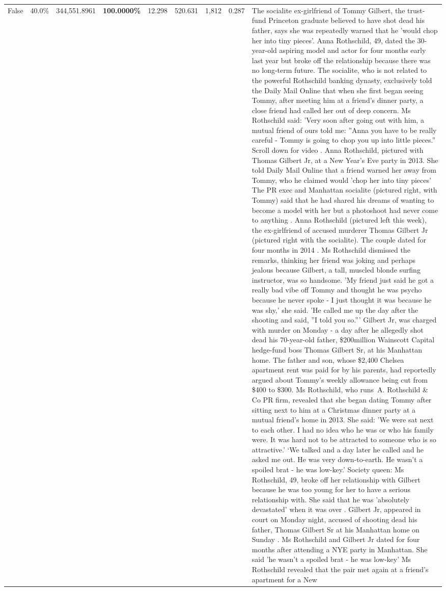 \begin{table}[H]
\begin{tabular}{lllrlllll}
False & 40.0\% & 344,551.8961 & \bfseries \color{red} 100.0000\% & 12.298 & 520.631 & 1,812 & 0.287 & The socialite ex-girlfriend of Tommy Gilbert, the trust-fund Princeton graduate believed to have shot dead his father, says she was repeatedly warned that he 'would chop her into tiny pieces'. Anna Rothschild, 49, dated the 30-year-old aspiring model and actor for four months early last year but broke off the relationship because there was no long-term future. The socialite, who is not related to the powerful Rothschild banking dynasty, exclusively told the Daily Mail Online that when she first began seeing Tommy, after meeting him at a friend's dinner party, a close friend had called her out of deep concern. Ms Rothschild said: 'Very soon after going out with him, a mutual friend of ours told me: ''Anna you have to be really careful - Tommy is going to chop you up into little pieces.'' Scroll down for video . Anna Rothschild, pictured with Thomas Gilbert Jr, at a New Year's Eve party in 2013. She told Daily Mail Online that a friend warned her away from Tommy, who he claimed would 'chop her into tiny pieces' The PR exec and Manhattan socialite (pictured right, with Tommy) said that he had shared his dreams of wanting to become a model with her but a photoshoot had never come to anything . Anna Rothschild (pictured left this week), the ex-girlfriend of accused murderer Thomas Gilbert Jr (pictured right with the socialite). The couple dated for four months in 2014 . Ms Rothschild dismissed the remarks, thinking her friend was joking and perhaps jealous because Gilbert, a tall, muscled blonde surfing instructor, was so handsome. 'My friend just said he got a really bad vibe off Tommy and thought he was psycho because he never spoke - I just thought it was because he was shy,' she said. 'He called me up the day after the shooting and said, ''I told you so.''' Gilbert Jr, was charged with murder on Monday - a day after he allegedly shot dead his 70-year-old father, \$200million Wainscott Capital hedge-fund boss Thomas Gilbert Sr, at his Manhattan home. The father and son, whose \$2,400 Chelsea apartment rent was paid for by his parents, had reportedly argued about Tommy's weekly allowance being cut from \$400 to \$300. Ms Rothschild, who runs A. Rothschild \& Co PR firm, revealed that she began dating Tommy after sitting next to him at a Christmas dinner party at a mutual friend's home in 2013. She said: 'We were sat next to each other. I had no idea who he was or who his family were. It was hard not to be attracted to someone who is so attractive.' ‘We talked and a day later he called and he asked me out. He was very down-to-earth. He wasn’t a spoiled brat - he was low-key.’ Society queen: Ms Rothschild, 49, broke off her relationship with Gilbert because he was too young for her to have a serious relationship with. She said that he was 'absolutely devastated' when it was over . Gilbert Jr, appeared in court on Monday night, accused of shooting dead his father, Thomas Gilbert Sr at his Manhattan home on Sunday . Ms Rothschild and Gilbert Jr dated for four months after attending a NYE party in Manhattan. She said 'he wasn't a spoiled brat - he was low-key' Ms Rothschild revealed that the pair met again at a friend’s apartment for a New 
\end{tabular}
\end{table}
